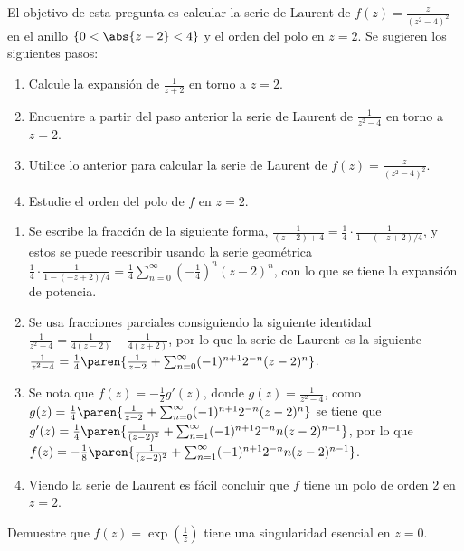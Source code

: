 \documentclass{homework}
\begin{document}
\begin{prob}
    El objetivo de esta pregunta es calcular la serie de Laurent de \(f(z)=\frac{z}{(z^2-4)^2}\) en el anillo \(\{0<\abs{z-2}<4\}\) y el orden del polo en \(z=2\). Se sugieren los siguientes pasos:
    \begin{enumerate}
        \item Calcule la expansión de \(\frac1{z+2}\) en torno a \(z=2\).
        \item Encuentre a partir del paso anterior la serie de Laurent de \(\frac1{z^2-4}\) en torno a \(z=2\).
        \item Utilice lo anterior para calcular la serie de Laurent de \(f(z)=\frac{z}{(z^2-4)^2}\).
        \item Estudie el orden del polo de \(f\) en \(z=2\).
    \end{enumerate}
\end{prob}

\begin{sol}
    \begin{enumerate}
        \item Se escribe la fracción de la siguiente forma, \(\frac1{(z-2)+4}=\frac14\cdot\frac1{1-(-z+2)/4}\), y estos se puede reescribir usando la serie geométrica \(\frac14\cdot\frac1{1-(-z+2)/4}=\frac14\sum_{n=0}^\infty(-\frac14)^n(z-2)^n\), con lo que se tiene la expansión de potencia.
        \item Se usa fracciones parciales consiguiendo la siguiente identidad \(\frac1{z^2-4}=\frac1{4(z-2)}-\frac1{4(z+2)}\), por lo que la serie de Laurent es la siguiente \(\frac1{z^2-4}=\frac14\paren{\frac1{z-2}+\sum_{n=0}^\infty(-1)^{n+1}2^{-n}(z-2)^n}\).
        \item Se nota que \(f(z)=-\frac12g'(z)\), donde \(g(z)=\frac1{z^2-4}\), como \(g(z)=\frac14\paren{\frac1{z-2}+\sum_{n=0}^\infty(-1)^{n+1}2^{-n}(z-2)^n}\) se tiene que \(g'(z)=\frac14\paren{\frac1{(z-2)^2}+\sum_{n=1}^\infty(-1)^{n+1}2^{-n}n(z-2)^{n-1}}\), por lo que \(f(z)=-\frac18\paren{\frac1{(z-2)^2}+\sum_{n=1}^\infty(-1)^{n+1}2^{-n}n(z-2)^{n-1}}\).
        \item Viendo la serie de Laurent es fácil concluir que \(f\) tiene un polo de orden 2 en \(z=2\).
    \end{enumerate}
\end{sol}

\begin{prob}
    Demuestre que \(f(z)=\exp(\frac1z)\) tiene una singularidad esencial en \(z=0\).
\end{prob}
\end{document}
